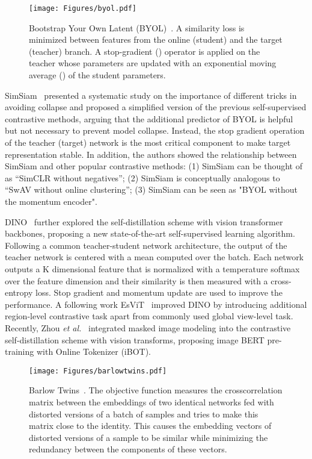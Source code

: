 \documentclass[lettersize,journal]{IEEEtran}
\newcommand{\etal}{\textit{et al.}}
\begin{document}
\begin{figure}
\centering
\texttt{[image: Figures/byol.pdf]}
\caption[BYOL]{Bootstrap Your Own Latent (BYOL)~\cite{grill2020bootstrap}. A similarity loss is minimized between features from the online (student) and the target (teacher) branch. A stop-gradient () operator is applied on the teacher whose parameters are updated with an exponential moving average () of the student parameters.
}
\label{fig:BYOL}
\end{figure}

SimSiam~\cite{chen2021exploring} presented a systematic study on the importance of different tricks in avoiding collapse and proposed a simplified version of the previous self-supervised contrastive methods, arguing that the additional predictor of BYOL is helpful but not necessary to prevent model collapse. Instead, the stop gradient operation of the teacher (target) network is the most critical component to make target representation stable. In addition, the authors showed the relationship between SimSiam and other popular contrastive methods: (1) SimSiam can be thought of as “SimCLR without negatives”; (2)  SimSiam is conceptually analogous to “SwAV without online clustering”; (3) SimSiam can be seen as "BYOL without the momentum encoder".


DINO~\cite{caron2021emerging} further explored the self-distillation scheme with vision transformer backbones, proposing a new state-of-the-art self-supervised learning algorithm. Following a common teacher-student network architecture, the output of the teacher network is centered with a mean computed over the batch. Each network outputs a K dimensional feature that is normalized with a temperature softmax over the feature dimension and their similarity is then measured with a cross-entropy loss. Stop gradient and momentum update are used to improve the performance. A following work EsViT~\cite{li2021efficient} improved DINO by introducing additional region-level contrastive task apart from commonly used global view-level task. Recently, Zhou \etal~\cite{zhou2021ibot} integrated masked image modeling into the contrastive self-distillation scheme with vision transforms, proposing image BERT pre-training with Online Tokenizer (iBOT).

\begin{figure}
\centering
\texttt{[image: Figures/barlowtwins.pdf]}
\caption[Barlow Twins]{Barlow Twins~\cite{zbontar2021barlow}. The objective function measures the crosscorrelation matrix between the embeddings of two identical networks fed with distorted versions of a batch of samples and tries to make this matrix close to the identity. This causes the embedding vectors of distorted versions of a sample to be similar while minimizing the redundancy between the components of these vectors.}
\label{fig:BarlowTwins}
\end{figure}
\end{document}
